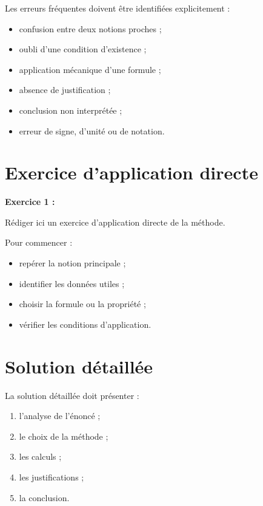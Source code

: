 \documentclass[11pt,a4paper]{article}
\begin{document}
\begin{cadreattention}
Les erreurs fréquentes doivent être identifiées explicitement :

\begin{itemize}
    \item confusion entre deux notions proches ;
    \item oubli d’une condition d’existence ;
    \item application mécanique d’une formule ;
    \item absence de justification ;
    \item conclusion non interprétée ;
    \item erreur de signe, d’unité ou de notation.
\end{itemize}
\end{cadreattention}

\section{Exercice d’application directe}

\begin{cadreenonce}
\textbf{Exercice 1 :}

Rédiger ici un exercice d’application directe de la méthode.
\end{cadreenonce}

\begin{cadreaide}
Pour commencer :
\begin{itemize}
    \item repérer la notion principale ;
    \item identifier les données utiles ;
    \item choisir la formule ou la propriété ;
    \item vérifier les conditions d’application.
\end{itemize}
\end{cadreaide}

\section{Solution détaillée}

\begin{cadresolution}
La solution détaillée doit présenter :
\begin{enumerate}
    \item l’analyse de l’énoncé ;
    \item le choix de la méthode ;
    \item les calculs ;
    \item les justifications ;
    \item la conclusion.
\end{enumerate}
\end{cadresolution}
\end{document}
